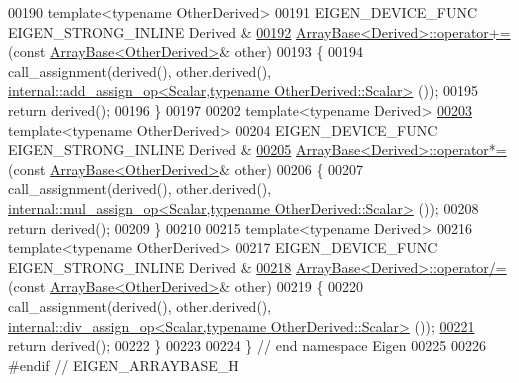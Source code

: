 \begin{DoxyCode}
00190 \textcolor{keyword}{template}<\textcolor{keyword}{typename} OtherDerived>
00191 EIGEN\_DEVICE\_FUNC EIGEN\_STRONG\_INLINE Derived &
\hyperlink{group___core___module_ab4bac4291bfd0da16f768d32398e7752}{00192} \hyperlink{group___core___module_class_eigen_1_1_array_base}{ArrayBase<Derived>::operator+=}(\textcolor{keyword}{const} 
      \hyperlink{group___core___module_class_eigen_1_1_array_base}{ArrayBase<OtherDerived>}& other)
00193 \{
00194   call\_assignment(derived(), other.derived(), 
      \hyperlink{struct_eigen_1_1internal_1_1add__assign__op}{internal::add\_assign\_op<Scalar,typename OtherDerived::Scalar>}
      ());
00195   \textcolor{keywordflow}{return} derived();
00196 \}
00197 
00202 \textcolor{keyword}{template}<\textcolor{keyword}{typename} Derived>
\hyperlink{group___core___module_abe1bff4421b16e62e75f932b83c4d31f}{00203} \textcolor{keyword}{template}<\textcolor{keyword}{typename} OtherDerived>
00204 EIGEN\_DEVICE\_FUNC EIGEN\_STRONG\_INLINE Derived &
\hyperlink{group___core___module_a3fc54e548f88415c3582add526b62525}{00205} \hyperlink{group___core___module_a3fc54e548f88415c3582add526b62525}{ArrayBase<Derived>::operator*=}(\textcolor{keyword}{const} 
      \hyperlink{group___core___module_class_eigen_1_1_array_base}{ArrayBase<OtherDerived>}& other)
00206 \{
00207   call\_assignment(derived(), other.derived(), 
      \hyperlink{struct_eigen_1_1internal_1_1mul__assign__op}{internal::mul\_assign\_op<Scalar,typename OtherDerived::Scalar>}
      ());
00208   \textcolor{keywordflow}{return} derived();
00209 \}
00210 
00215 \textcolor{keyword}{template}<\textcolor{keyword}{typename} Derived>
00216 \textcolor{keyword}{template}<\textcolor{keyword}{typename} OtherDerived>
00217 EIGEN\_DEVICE\_FUNC EIGEN\_STRONG\_INLINE Derived &
\hyperlink{group___core___module_a91860c840ac453449c1ac65fc61065f8}{00218} \hyperlink{group___core___module_a91860c840ac453449c1ac65fc61065f8}{ArrayBase<Derived>::operator/=}(\textcolor{keyword}{const} 
      \hyperlink{group___core___module_class_eigen_1_1_array_base}{ArrayBase<OtherDerived>}& other)
00219 \{
00220   call\_assignment(derived(), other.derived(), 
      \hyperlink{struct_eigen_1_1internal_1_1div__assign__op}{internal::div\_assign\_op<Scalar,typename OtherDerived::Scalar>}
      ());
\hyperlink{group___core___module_a8f857f93533ac386282f47c5ef05459a}{00221}   \textcolor{keywordflow}{return} derived();
00222 \}
00223 
00224 \} \textcolor{comment}{// end namespace Eigen}
00225 
00226 \textcolor{preprocessor}{#endif // EIGEN\_ARRAYBASE\_H}
\end{DoxyCode}
